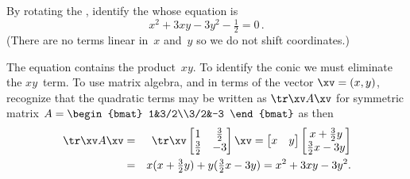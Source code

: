 \begin{example} \label{eg:csrc2}
By rotating the , identify the  whose equation is
\begin{equation*}
x^2+3xy-3y^2-\tfrac12=0\,.
\end{equation*}
(There are no terms linear in~\(x\) and~\(y\) so we do not shift coordinates.)
\begin{solution} 
The equation contains the product~\(xy\).
To identify the conic we must eliminate the \(xy\)~term.
To use matrix algebra, and in terms of the vector \(\xv=(x,y)\), recognize that the quadratic terms may be written as \(\tr\xv A\xv\) for symmetric matrix \(A=\begin{bmat} 1&3/2\\3/2&-3 \end{bmat}\) as then
\begin{eqnarray*}
\tr\xv A\xv
&=&\tr\xv\begin{bmatrix} 1&\frac32\\\frac32&-3 \end{bmatrix}\xv
=\begin{bmatrix} x&y \end{bmatrix}\begin{bmatrix} x+\frac32y\\\frac32x-3y \end{bmatrix}
\\&=&x(x+\tfrac32y)+y(\tfrac32x-3y)
=x^2+3xy-3y^2.
\end{eqnarray*}


\end{solution}
\end{example}

